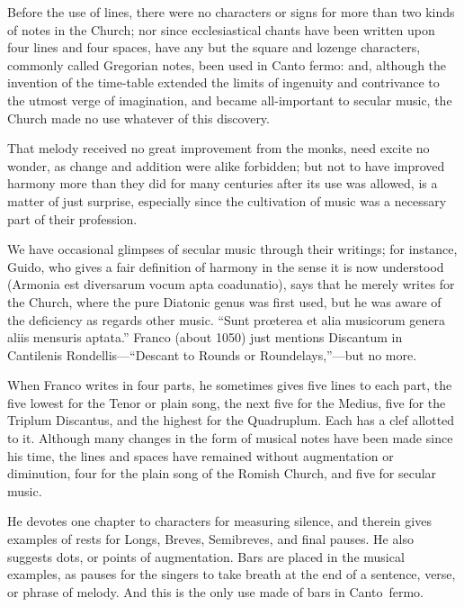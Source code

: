 Before the use of lines, there were no characters or signs for more than two
kinds of notes in the Church; nor since ecclesiastical chants have been written
upon four lines and four spaces, have any but the square and lozenge characters,
commonly called Gregorian notes, been used in Canto fermo: and, although the
invention of the time-table extended the limits of ingenuity and contrivance to
the utmost verge of imagination, and became all-important to secular music,
the Church made no use whatever of this discovery.

That melody received no great improvement from the monks, need excite
no wonder, as change and addition were alike forbidden; but not to have
improved harmony more than they did for many centuries after its use was
allowed, is a matter of just surprise, especially since the cultivation of music
was a necessary part of their profession.

We have occasional glimpses of secular music through their writings; for
instance, Guido, who gives a fair definition of harmony in the sense it is now
understood (Armonia est diversarum vocum apta coadunatio), says that he
merely writes for the Church, where the pure Diatonic genus was first used, but
he was aware of the deficiency as regards other music. “Sunt prœterea et alia
musicorum genera aliis mensuris aptata.” Franco (about 1050) just mentions
Discantum in Cantilenis Rondellis—“Descant to Rounds or Roundelays,”—but
no more.

When Franco writes in four parts, he sometimes gives five lines to each part,
the five lowest for the Tenor or plain song, the next five for the Medius, five for
the Triplum Discantus, and the highest for the Quadruplum. Each has a clef
allotted to it. Although many changes in the form of musical notes have been
made since his time, the lines and spaces have remained without augmentation or
diminution, four for the plain song of the Romish Church, and five for secular
music.

He devotes one chapter to characters for measuring silence, and therein gives
examples of rests for Longs, Breves, Semibreves, and final pauses. He also
suggests dots, or points of augmentation. Bars are placed in the musical examples,
as pauses for the singers to take breath at the end of a sentence, verse, or phrase
of melody. And this is the only use made of bars in Canto~fermo.
\pagebreak